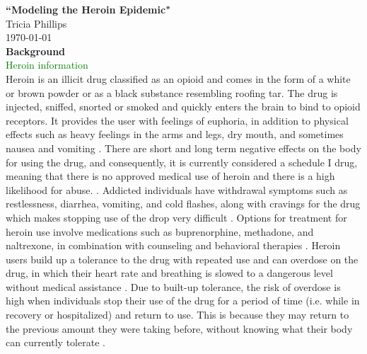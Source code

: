 \documentclass[12pt]{article}
\begin{document}
\textbf{``Modeling the Heroin Epidemic"} \\
Tricia Phillips \\
\today \\


\textbf{Background} \\
\textcolor{green}{Heroin information} \\
Heroin is an illicit drug classified as an opioid and comes in the form of a white or brown powder or as a black substance resembling roofing tar. The drug is injected, sniffed, snorted or smoked and quickly enters the brain to bind to opioid receptors. It provides the user with feelings of euphoria, in addition to physical effects such as heavy feelings in the arms and legs, dry mouth, and sometimes nausea and vomiting \cite{NIH1, NIDA2}. There are short and long term negative effects on the body for using the drug, and consequently, it is currently considered a schedule I drug, meaning that there is no approved medical use of heroin and there is a high likelihood for abuse. \cite{DEA1, NIH1}. Addicted individuals have withdrawal symptoms such as restlessness, diarrhea, vomiting, and cold flashes, along with cravings for the drug which makes stopping use of the drop very difficult \cite{NIH1}. Options for treatment for heroin use involve medications such as buprenorphine, methadone, and naltrexone, in combination with counseling and behavioral therapies \cite{SAMSHA1, NIH1}. Heroin users build up a tolerance to the drug with repeated use and can overdose on the drug, in which their heart rate and breathing is slowed to a dangerous level without medical assistance \cite{NIDA2, NIH1}. Due to built-up tolerance, the risk of overdose is high when individuals stop their use of the drug for a period of time (i.e. while in recovery or hospitalized) and return to use. This is because they may return to the previous amount they were taking before, without knowing what their body can currently tolerate \cite{NIH2}.  
\end{document}
